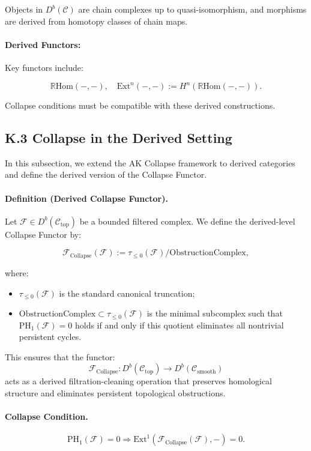 \documentclass[11pt]{article}
\begin{document}
Objects in \( D^b(\mathcal{C}) \) are chain complexes up to quasi-isomorphism, and morphisms are derived from homotopy classes of chain maps.

\paragraph{Derived Functors:}
Key functors include:

\[
\mathbb{R}\mathrm{Hom}(-, -), \quad \mathrm{Ext}^n(-, -) := H^n(\mathbb{R}\mathrm{Hom}(-, -)).
\]

Collapse conditions must be compatible with these derived constructions.

\subsection*{K.3 Collapse in the Derived Setting}

In this subsection, we extend the AK Collapse framework to derived categories and define the derived version of the Collapse Functor.

\paragraph{Definition (Derived Collapse Functor).}
Let \( \mathcal{F} \in D^b(\mathcal{C}_{\mathrm{top}}) \) be a bounded filtered complex.  
We define the derived-level Collapse Functor by:

\[
\mathcal{F}_{\mathrm{Collapse}}(\mathcal{F}) := \tau_{\leq 0}(\mathcal{F}) / \mathrm{ObstructionComplex},
\]

where:
\begin{itemize}
    \item \( \tau_{\leq 0}(\mathcal{F}) \) is the standard canonical truncation;
    \item \( \mathrm{ObstructionComplex} \subset \tau_{\leq 0}(\mathcal{F}) \) is the minimal subcomplex such that \( \mathrm{PH}_1(\mathcal{F}) = 0 \) holds if and only if this quotient eliminates all nontrivial persistent cycles.
\end{itemize}

This ensures that the functor:
\[
\mathcal{F}_{\mathrm{Collapse}} : D^b(\mathcal{C}_{\mathrm{top}}) \to D^b(\mathcal{C}_{\mathrm{smooth}})
\]
acts as a derived filtration-cleaning operation that preserves homological structure and eliminates persistent topological obstructions.

\paragraph{Collapse Condition.}
\[
\mathrm{PH}_1(\mathcal{F}) = 0 \Rightarrow \mathrm{Ext}^1(\mathcal{F}_{\mathrm{Collapse}}(\mathcal{F}), -) = 0.
\]
\end{document}
